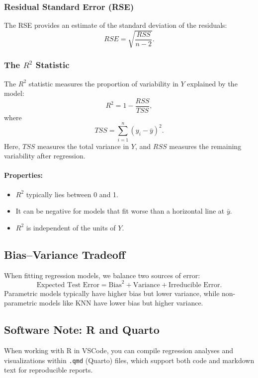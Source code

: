 \subsubsection{Residual Standard Error (RSE)}

The RSE provides an estimate of the standard deviation of the residuals:
\[
RSE = \sqrt{\frac{RSS}{n - 2}}.
\]

\subsubsection{The \(R^2\) Statistic}

The \(R^2\) statistic measures the proportion of variability in \(Y\) explained by the model:
\[
R^2 = 1 - \frac{RSS}{TSS},
\]
where
\[
TSS = \sum_{i=1}^{n} (y_i - \bar{y})^2.
\]
Here, \(TSS\) measures the total variance in \(Y\), and \(RSS\) measures the remaining variability after regression.

\paragraph{Properties:}
\begin{itemize}
    \item \(R^2\) typically lies between 0 and 1.
    \item It can be negative for models that fit worse than a horizontal line at \(\bar{y}\).
    \item \(R^2\) is independent of the units of \(Y\).
\end{itemize}

\subsection{Bias–Variance Tradeoff}

When fitting regression models, we balance two sources of error:
\[
\text{Expected Test Error} = \text{Bias}^2 + \text{Variance} + \text{Irreducible Error}.
\]
Parametric models typically have higher bias but lower variance, while non-parametric models like KNN have lower bias but higher variance.

\subsection{Software Note: R and Quarto}

When working with R in VSCode, you can compile regression analyses and visualizations within \texttt{.qmd} (Quarto) files, which support both code and markdown text for reproducible reports.

